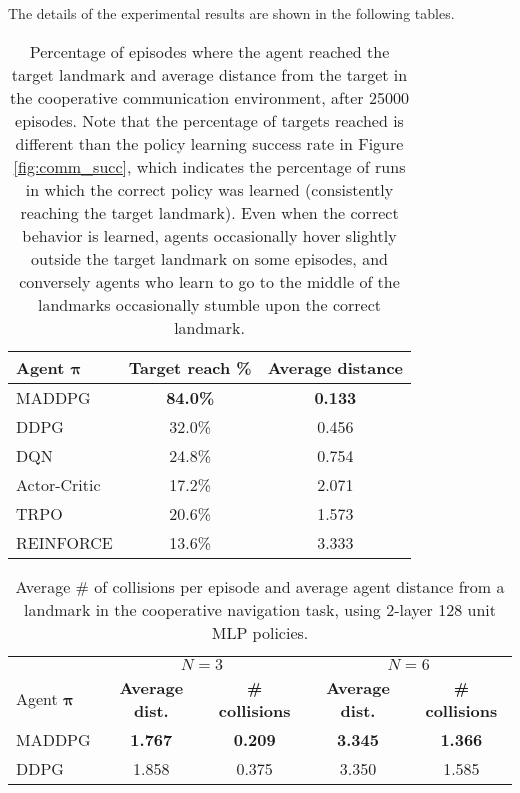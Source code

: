 \documentclass{article}
\newcommand{\comment}[1]{\textbf{\textcolor{red}{comment: #1}}}
\newcommand{\pol}[0]{\pmb{\pi}}
\begin{document}
The details of the experimental results are shown in the following tables.

\begin{table*}[ht!]
\small
\centering
\begin{tabular}{l c c}
\toprule
Agent $\pol$& \textbf{Target reach \% }&    \textbf{Average distance}   \\ \hline
MADDPG &  \textbf{84.0\%} & \textbf{0.133}  \\
DDPG &  32.0\% & 0.456 \\
DQN & 24.8\% & 0.754 \\
Actor-Critic & 17.2\% & 2.071 \\
TRPO & 20.6\% & 1.573 \\
REINFORCE &  13.6\%  & 3.333 \\
\bottomrule
\end{tabular}
\caption{\label{tab:simple_speaker_listener} Percentage of episodes where the agent reached the target landmark and average distance from the target in the cooperative communication environment, after 25000 episodes. Note that the percentage of targets reached is different than the policy learning success rate in Figure \ref{fig:comm_succ}, which indicates the percentage of runs in which the correct policy was learned (consistently reaching the target landmark). Even when the correct behavior is learned, agents occasionally hover slightly outside the target landmark on some episodes, and conversely agents who learn to go to the middle of the landmarks occasionally stumble upon the correct landmark.}
\end{table*}


\begin{table*}[ht!]
\small
\centering
\begin{tabular}{l c c c c}
\toprule
& \multicolumn{2}{c}{ $N = 3$} & \multicolumn{2}{c}{ $N = 6$} \\
Agent $\pol$& \textbf{Average dist.}&    \textbf{\# collisions} & \textbf{Average dist.}&    \textbf{\# collisions}   \\ \hline
MADDPG &  \textbf{1.767} & \textbf{0.209} & \textbf{3.345} & \textbf{1.366}  \\
DDPG &  1.858 & 0.375 & 3.350 & 1.585 \\
\bottomrule
\end{tabular}
\caption{\label{tab:simple_spread} Average \# of collisions per episode and average agent distance from a landmark in the cooperative navigation task, using 2-layer 128 unit MLP policies.}
\end{table*}
\end{document}
